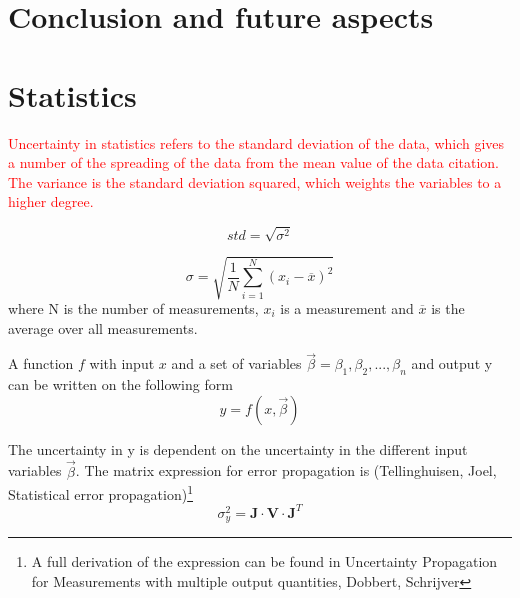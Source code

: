 \documentclass[a4paper,11pt,twoside]{book}
\begin{document}
\noindent 


\chapter{Conclusion and future aspects}\label{Chapter:Conclusion}
\noindent









\appendix 

\chapter{Statistics} \label{ch_app:statistics}

\noindent \textcolor{red}{Uncertainty in statistics refers to the standard deviation of the data, which gives a number of the spreading of the data from the mean value of the data \textcolor{red}{citation}. The variance is the standard deviation squared, which weights the variables to a higher degree. }

\begin{equation}
    std = \sqrt{\sigma^2}
\end{equation}

\begin{equation}
    \sigma = \sqrt{\frac{1}{N}\sum_{i=1}^N (x_i - \overline{x})^2}
\end{equation}
\noindent
where N is the number of measurements, $x_i$ is a measurement and $\overline{x}$ is the average over all measurements. 


\noindent 
A function $f$ with input $x$ and a set of variables $\vec{\beta}= \beta_1, \beta_2, ..., \beta_n$ and output y can be written on the following form
\begin{equation}
    y = f(x, \vec{\beta})
\end{equation}

\noindent The uncertainty in y is dependent on the uncertainty in the different input variables $ \vec{\beta}$. The matrix expression for error propagation is (Tellinghuisen, Joel, Statistical error propagation)\footnote{A full derivation of the expression can be found in Uncertainty Propagation for Measurements with multiple output quantities, Dobbert, Schrijver}
\begin{equation} \label{eq:variance_full}
    \sigma^2_y = \mathbf{J}\cdot \mathbf{V}\cdot \mathbf{J}^T 
\end{equation} 
\end{document}
